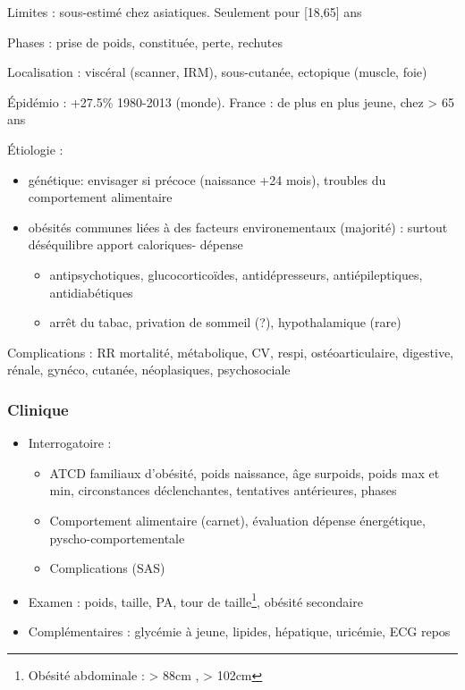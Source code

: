 \documentclass{book}
\begin{document}
Limites : sous-estimé chez asiatiques. Seulement pour [18,65] ans

Phases : prise de poids, constituée, perte, rechutes

Localisation : viscéral (scanner, IRM), sous-cutanée, ectopique (muscle, foie)

Épidémio : +27.5\% 1980-2013 (monde). France : de plus en plus jeune, \inc chez >
65 ans

Étiologie :
\begin{itemize}
\item génétique: envisager si précoce (naissance +24 mois), troubles du
comportement alimentaire
\item obésités communes liées à des facteurs environementaux (majorité) : surtout
déséquilibre apport caloriques- dépense
\begin{itemize}
\item antipsychotiques, glucocorticoïdes, antidépresseurs,
antiépileptiques, antidiabétiques
\item arrêt du tabac, privation de sommeil (?), hypothalamique (rare)
\end{itemize}
\end{itemize}

Complications : \inc RR mortalité, métabolique, CV, respi, ostéoarticulaire,
digestive, rénale, gynéco, cutanée, néoplasiques, psychosociale

\subsubsection{Clinique}
\label{sec:orgf0c78d6}
\begin{itemize}
\item Interrogatoire : 
\begin{itemize}
\item ATCD familiaux d'obésité, poids naissance, âge surpoids,
poids max et min, circonstances déclenchantes, tentatives antérieures, phases
\item Comportement alimentaire (carnet), évaluation dépense énergétique, pyscho-comportementale
\item Complications (SAS)
\end{itemize}
\item Examen : poids, taille, PA, tour de taille\footnote{Obésité abdominale : > 88cm \female, > 102cm \male}, obésité secondaire
\item Complémentaires : glycémie à jeune, lipides, hépatique, uricémie, ECG repos
\end{itemize}
\end{document}
